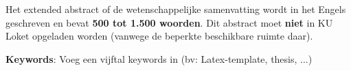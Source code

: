 Het extended abstract of de wetenschappelijke samenvatting wordt in het Engels
geschreven en bevat {\bf 500 tot 1.500 woorden}. Dit abstract moet {\bf niet}
in KU Loket opgeladen worden (vanwege de beperkte beschikbare ruimte daar).

\textbf{Keywords}: Voeg een vijftal keywords in (bv: Latex-template, thesis, ...)
